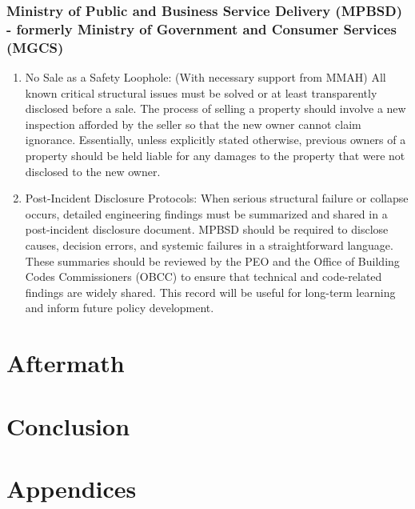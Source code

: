 \documentclass[12pt]{article}
\begin{document}
\subsubsection{Ministry of Public and Business Service Delivery (MPBSD) - formerly Ministry of Government and Consumer Services (MGCS)}
\begin{enumerate}
    \item No Sale as a Safety Loophole: (With necessary support from MMAH) All known critical structural issues must be solved or at least transparently disclosed before a sale. The process of selling a property should involve a new inspection afforded by the seller so that the new owner cannot claim ignorance. Essentially, unless explicitly stated otherwise, previous owners of a property should be held liable for any damages to the property that were not disclosed to the new owner.

    \item Post-Incident Disclosure Protocols: When serious structural failure or collapse occurs, detailed engineering findings must be summarized and shared in a post-incident disclosure document. MPBSD should be required to disclose causes, decision errors, and systemic failures in a straightforward language. These summaries should be reviewed by the PEO and the Office of Building Codes Commissioners (OBCC) to ensure that technical and code-related findings are widely shared. This record will be useful for long-term learning and inform future policy development.
\end{enumerate}




\section{Aftermath}

\section{Conclusion}


\section*{Appendices}

\newpage
\printbibliography
\end{document}

